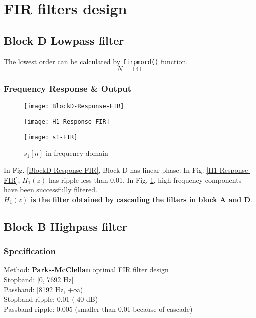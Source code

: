 \documentclass{article}
\newenvironment{homeworkProblem}[1]{
	\section{#1}
	}{
}
\newenvironment{homeworkSection}[1]{
	\subsection{#1}
	}{
}
\begin{document}
\begin{homeworkProblem}{FIR filters design}
\begin{homeworkSection}{Block D Lowpass filter}
The lowest order can be calculated by \texttt{firpmord()} function.
\begin{equation}
N = 141
\end{equation}


\subsubsection{Frequency Response \& Output}
\begin{figure}[H]
\begin{minipage}[t]{0.33\linewidth}
\centering
\texttt{[image: BlockD-Response-FIR]}
\caption{Block D response}
\label{BlockD-Response-FIR}
\end{minipage}
\begin{minipage}[t]{0.33\linewidth}
\centering
\texttt{[image: H1-Response-FIR]}
\caption{$H_1(z)$ Response}
\label{H1-Response-FIR}
\end{minipage}
\begin{minipage}[t]{0.33\linewidth}
\centering
\texttt{[image: s1-FIR]}
\caption{$s_1[n]$ in frequency domain}
\label{s1-FIR}
\end{minipage}
\end{figure}

In Fig. \ref{BlockD-Response-FIR}, Block D has linear phase. In Fig. \ref{H1-Response-FIR}, $H_1(z)$ has ripple less than 0.01. In Fig. \ref{s1-FIR}, high frequency components have been successfully filtered.\\

\textbf{$H_1(z)$ is the filter obtained by cascading the filters in block A and D}.

\end{homeworkSection}


\begin{homeworkSection}{Block B Highpass filter}

\subsubsection{Specification}
Method: \textbf{Parks-McClellan} optimal FIR filter design\\
Stopband: [0, 7692 Hz]\\
Passband: [8192 Hz, $+\infty$)\\
Stopband ripple: 0.01 (-40 dB)\\
Passband ripple: 0.005 (smaller than 0.01 because of cascade)\\


\end{homeworkSection}
\end{homeworkProblem}
\end{document}
